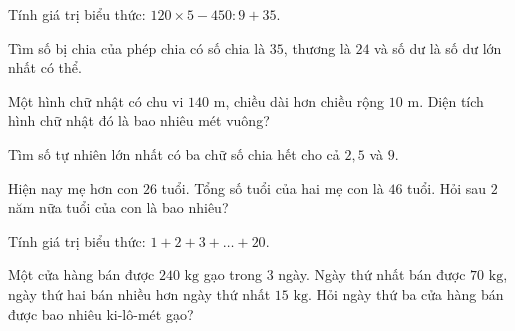 \begin{ex}
  Tính giá trị biểu thức: $120 \times 5 - 450 : 9 + 35$.
\end{ex}

\begin{ex}
  Tìm số bị chia của phép chia có số chia là $35$, thương là $24$ và số dư là số dư lớn nhất có thể.
\end{ex}

\begin{ex}
  Một hình chữ nhật có chu vi $140\text{ m}$, chiều dài hơn chiều rộng $10\text{ m}$. Diện tích hình chữ nhật đó là bao nhiêu mét vuông?
\end{ex}

\begin{ex}
  Tìm số tự nhiên lớn nhất có ba chữ số chia hết cho cả $2, 5$ và $9$.
\end{ex}

\begin{ex}
  Hiện nay mẹ hơn con $26$ tuổi. Tổng số tuổi của hai mẹ con là $46$ tuổi. Hỏi sau $2$ năm nữa tuổi của con là bao nhiêu?
\end{ex}

\begin{ex}
  Tính giá trị biểu thức: $1 + 2 + 3 + \dots + 20$.
\end{ex}

\begin{ex}
  Một cửa hàng bán được $240\text{ kg}$ gạo trong 3 ngày. Ngày thứ nhất bán được $70\text{ kg}$, ngày thứ hai bán nhiều hơn ngày thứ nhất $15\text{ kg}$. Hỏi ngày thứ ba cửa hàng bán được bao nhiêu ki-lô-mét gạo?
\end{ex}

